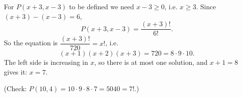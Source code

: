 For $P(x+3,x-3)$ to be defined we need $x-3\ge0$, i.e. $x\ge3$. Since $(x+3)-(x-3)=6$,
\[P(x+3,x-3)=\dfrac{(x+3)!}{6!}.\]
So the equation is $\dfrac{(x+3)!}{720}=x!$, i.e.
\[(x+1)(x+2)(x+3)=720=8\cdot9\cdot10.\]
The left side is increasing in $x$, so there is at most one solution, and $x+1=8$ gives it: $\boxed{x=7}$.

(Check: $P(10,4)=10\cdot9\cdot8\cdot7=5040=7!$.)
